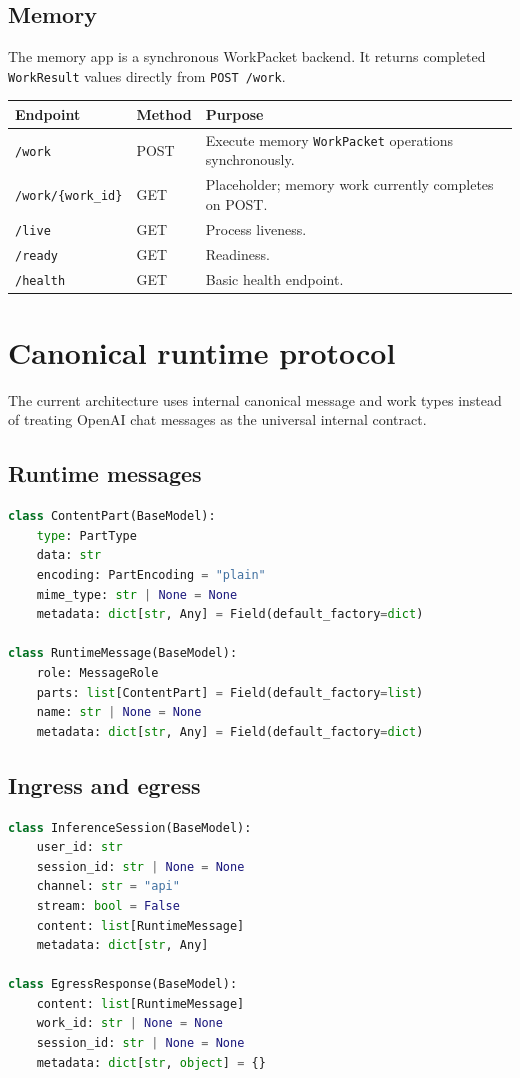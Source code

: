 \documentclass[11pt,a4paper]{article}
\begin{document}
\subsection{Memory}
The memory app is a synchronous WorkPacket backend. It returns completed \texttt{WorkResult} values directly from \texttt{POST /work}.

\begin{longtable}{@{}p{4cm}p{2cm}p{8cm}@{}}
\toprule
\textbf{Endpoint} & \textbf{Method} & \textbf{Purpose} \\
\midrule
\endhead
\texttt{/work} & POST & Execute memory \texttt{WorkPacket} operations synchronously. \\
\texttt{/work/\{work\_id\}} & GET & Placeholder; memory work currently completes on POST. \\
\texttt{/live} & GET & Process liveness. \\
\texttt{/ready} & GET & Readiness. \\
\texttt{/health} & GET & Basic health endpoint. \\
\bottomrule
\end{longtable}

\section{Canonical runtime protocol}
The current architecture uses internal canonical message and work types instead of treating OpenAI chat messages as the universal internal contract.

\subsection{Runtime messages}
\begin{lstlisting}[language=Python]
class ContentPart(BaseModel):
    type: PartType
    data: str
    encoding: PartEncoding = "plain"
    mime_type: str | None = None
    metadata: dict[str, Any] = Field(default_factory=dict)

class RuntimeMessage(BaseModel):
    role: MessageRole
    parts: list[ContentPart] = Field(default_factory=list)
    name: str | None = None
    metadata: dict[str, Any] = Field(default_factory=dict)
\end{lstlisting}

\subsection{Ingress and egress}
\begin{lstlisting}[language=Python]
class InferenceSession(BaseModel):
    user_id: str
    session_id: str | None = None
    channel: str = "api"
    stream: bool = False
    content: list[RuntimeMessage]
    metadata: dict[str, Any]

class EgressResponse(BaseModel):
    content: list[RuntimeMessage]
    work_id: str | None = None
    session_id: str | None = None
    metadata: dict[str, object] = {}
\end{lstlisting}
\end{document}

